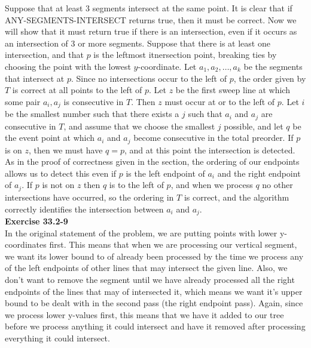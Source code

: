 \documentclass{article}
\begin{document}
Suppose that at least 3 segments intersect at the same point.  It is clear that if ANY-SEGMENTS-INTERSECT returns true, then it must be correct.  Now we will show that it must return true if there is an intersection, even if it occurs as an intersection of 3 or more segments.  Suppose that there is at least one intersection, and that $p$ is the leftmost itnersection point, breaking ties by choosing the point with the lowest $y$-coordinate.  Let $a_1, a_2, \ldots, a_k$ be the segments that intersect at $p$.  Since no intersections occur to the left of $p$, the order given by $T$ is correct at all points to the left of $p$.  Let $z$ be the first sweep line at which some pair $a_i, a_j$ is consecutive in $T$. Then $z$ must occur at or to the left of $p$.  Let $i$ be the smallest number such that there exists a $j$ such that $a_i$ and $a_j$ are consecutive in $T$, and assume that we choose the smallest $j$ possible, and let $q$ be the event point at which $a_i$ and $a_j$ become consecutive in the total preorder.  If $p$ is on $z$, then we must have $q=p$, and at this point the intersection is detected. As in the proof of correctness given in the section, the ordering of our endpoints allows us to detect this even if $p$ is the left endpoint of $a_i$ and the right endpoint of $a_j$.  If $p$ is not on $z$ then $q$ is to the left of $p$, and when we process $q$ no other intersections have occurred, so the ordering in $T$ is correct, and the algorithm correctly identifies the intersection between $a_i$ and $a_j$. \\


\noindent\textbf{Exercise 33.2-9}\\

In the original statement of the problem, we are putting points with lower y-coordinates first. This means that when we are processing our vertical segment, we want its  lower bound to of already been processed by the time we process any of the left endpoints of other lines that may intersect the given line.  Also, we don't want to remove the segment until we have already processed all the right endpoints of the lines that may of intersected it, which means we want it's upper bound to be dealt with in the second pass (the right endpoint pass). Again, since we process lower y-values first, this means that we have it added to our tree before we process anything it could intersect and have it removed after processing everything it could intersect.\\
\end{document}
